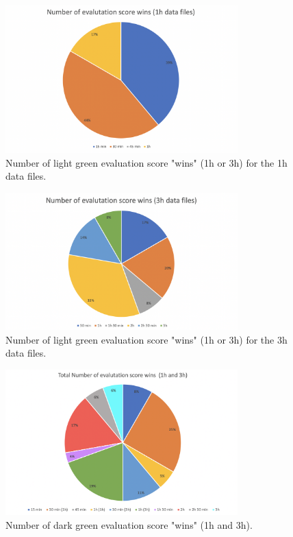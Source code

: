 \begin{figure}
  \centering
  \includegraphics[width=0.8\textwidth]{./images/clusteringResults/clusteringResultsGraph1h.png}
  \caption{Number of light green evaluation score "wins" (1h or 3h) for the 1h data files.}
  \label{figure:clusteringResultsGraph1h}
\end{figure}

\begin{figure}
  \centering
  \includegraphics[width=0.8\textwidth]{./images/clusteringResults/clusteringResultsGraph3h.png}
  \caption{Number of light green evaluation score "wins" (1h or 3h) for the 3h data files.}
  \label{figure:clusteringResultsGraph3h}
\end{figure}

\begin{figure}
  \centering
  \includegraphics[width=0.8\textwidth]{./images/clusteringResults/clusteringResultsGraphTotal.png}
  \caption{Number of dark green evaluation score "wins" (1h and 3h).}
  \label{figure:clusteringResultsGraphTotal}
\end{figure}






